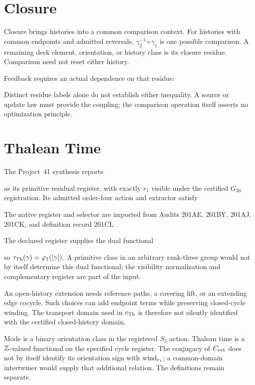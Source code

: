 \section{Closure}
Closure brings histories into a common comparison context. For histories with common endpoints and admitted reversals, $\gamma_2^{-1}\circ\gamma_1$ is one possible comparison. A remaining deck element, orientation, or history class is its closure residue. Comparison need not reset either history.

Feedback requires an actual dependence on that residue:

Distinct residue labels alone do not establish either inequality. A source or update law must provide the coupling; the comparison operation itself asserts no optimization principle.



\section{Thalean Time}\label{sec:time}
The Project~41 synthesis reports

as its primitive residual register, with exactly $r_1$ visible under the certified $G_{30}$ registration. Its admitted order-four action and extractor satisfy

The native register and selector are imported from Audits 201AE, 201BY, 201AJ, 201CK, and definition record 201CL \citep[Sec.~17]{cave2026becoming}.


The declared register supplies the dual functional

so $\tau_{\mathrm{Th}}(\gamma)=\varphi_1([\gamma])$. A primitive class in an arbitrary rank-three group would not by itself determine this dual functional; the visibility normalization and complementary register are part of the input.


An open-history extension needs reference paths, a covering lift, or an extending edge cocycle. Such choices can add endpoint terms while preserving closed-cycle winding. The transport domain used in $c_{\mathrm{Th}}$ is therefore not silently identified with the certified closed-history domain.

Mode is a binary orientation class in the registered $S_3$ action. Thalean time is a $\mathbb Z$-valued functional on the specified cycle register. The conjugacy of $C_{\mathrm{evt}}$ does not by itself identify its orientation sign with $\operatorname{wind}_{r_1}$; a common-domain intertwiner would supply that additional relation. The definitions remain separate.

